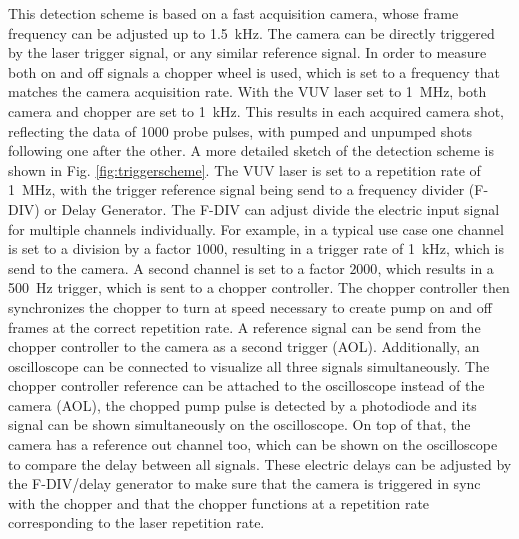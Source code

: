 This detection scheme is based on a fast acquisition camera, whose frame frequency can be adjusted up to \qty{1.5}{\kilo\hertz}.
The camera can be directly triggered by the laser trigger signal, or any similar reference signal.
In order to measure both on and off signals a chopper wheel is used, which is set to a frequency that matches the camera acquisition rate.
With the VUV laser set to \qty{1}{\mega\hertz}, both camera and chopper are set to \qty{1}{\kilo\hertz}.
This results in each acquired camera shot, reflecting the data of 1000 probe pulses, with pumped and unpumped shots following one after the other.
A more detailed sketch of the detection scheme is shown in Fig. \ref{fig:triggerscheme}.
The VUV laser is set to a repetition rate of \qty{1}{\mega\hertz}, with the trigger reference signal being send to a frequency divider (F-DIV) or Delay Generator.
The F-DIV can adjust divide the electric input signal for multiple channels individually.
For example, in a typical use case one channel is set to a division by a factor $1000$, resulting in a trigger rate of \qty{1}{\kilo\hertz}, which is send to the camera.
A second channel is set to a factor $2000$, which results in a \qty{500}{\hertz} trigger, which is sent to a chopper controller.
The chopper controller then synchronizes the chopper to turn at speed necessary to create pump on and off frames at the correct repetition rate.
A reference signal can be send from the chopper controller to the camera as a second trigger (AOL).
Additionally, an oscilloscope can be connected to visualize all three signals simultaneously.
The chopper controller reference can be attached to the oscilloscope instead of the camera (AOL), the chopped pump pulse is detected by a photodiode and its signal can be shown simultaneously on the oscilloscope.
On top of that, the camera has a reference out channel too, which can be shown on the oscilloscope to compare the delay between all signals.
These electric delays can be adjusted by the F-DIV/delay generator to make sure that the camera is triggered in sync with the chopper and that the chopper functions at a repetition rate corresponding to the laser repetition rate.


